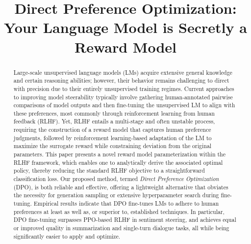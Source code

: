 \title{Direct Preference Optimization: Your Language Model is Secretly a Reward Model}

\begin{abstract}
Large-scale unsupervised language models (LMs) acquire extensive general knowledge and certain reasoning abilities; however, their behavior remains challenging to direct with precision due to their entirely unsupervised training regimes. Current approaches to improving model steerability typically involve gathering human-annotated pairwise comparisons of model outputs and then fine-tuning the unsupervised LM to align with these preferences, most commonly through reinforcement learning from human feedback (RLHF). Yet, RLHF entails a multi-stage and often unstable process, requiring the construction of a reward model that captures human preference judgments, followed by reinforcement learning-based adaptation of the LM to maximize the surrogate reward while constraining deviation from the original parameters. This paper presents a novel reward model parameterization within the RLHF framework, which enables one to analytically derive the associated optimal policy, thereby reducing the standard RLHF objective to a straightforward classification loss. Our proposed method, termed \textit{Direct Preference Optimization} (DPO), is both reliable and effective, offering a lightweight alternative that obviates the necessity for generation sampling or extensive hyperparameter search during fine-tuning. Empirical results indicate that DPO fine-tunes LMs to adhere to human preferences at least as well as, or superior to, established techniques. In particular, DPO fine-tuning surpasses PPO-based RLHF in sentiment steering, and achieves equal or improved quality in summarization and single-turn dialogue tasks, all while being significantly easier to apply and optimize.
\end{abstract}

